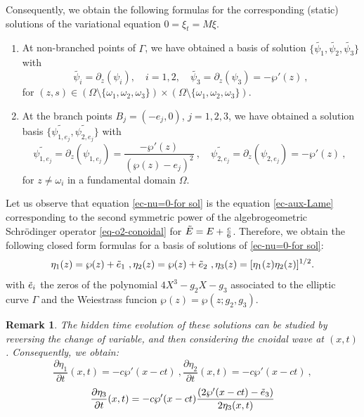 \documentclass[a4paper,12pt]{article}
\newtheorem{rem}[thm]{Remark}
\begin{document}
Consequently, we obtain the following formulas for the corresponding (static) solutions of the variational equation $0=\xi_t = M \xi$.

\begin{enumerate}
    \item At non-branched points of $\Gamma$, we have obtained a basis of solution $\{ \widetilde{\psi_1 }, \widetilde{\psi_2 }, \widetilde{\psi_3 } \} $  with
    \begin{equation*}
       \widetilde{\psi_i } = \partial_z (\psi_i )  , \quad i =1, 2 , \quad \widetilde{\psi_3 }= \partial_z ( \psi_3 ) = -\wp' (z)\ ,
    \end{equation*}
    for $(z,s ) \in \left( \Omega\setminus \{ \omega_1 , \omega_2 ,\omega_3 \} \right)\times \left( \Omega\setminus \{ \omega_1 , \omega_2 ,\omega_3 \} \right)$.
    \item At the branch points $B_j = (-e_j , 0)$, $j=1, 2, 3$, we have obtained a solution basis $\{ \widetilde{\psi_{1, e_j }} , \widetilde{\psi_{2, e_j }}  \} $  with
    \begin{equation*}
       \widetilde{\psi_{1, e_j }} =\partial_z ( \psi_{1, e_j })= \frac{-\wp' (z)}{(\wp (z)-e_j )^2 } \ , \quad  \widetilde{\psi_{2, e_j } } = \partial_z ( \psi_{2, e_j })= -\wp'(z)  \  , \  
    \end{equation*}
    for $z\not= \omega_i $ in a fundamental domain $\Omega$. 
\end{enumerate}



Let us observe that equation \eqref{ec-nu=0-for sol} is the equation \eqref{ec-aux-Lame} corresponding to the second symmetric power of the algebrogeometric Schr\"odinger operator \eqref{eq-o2-conoidal} for $\Tilde{E}= E+\frac{c}{6}$. Therefore, we obtain the following closed form formulas for a basis of solutions of \eqref{ec-nu=0-for sol}:
\begin{equation}
    \eta_1 (z)= \wp (z)+\Tilde{e}_1 \ , 
     \eta_2 (z)= \wp (z)+\Tilde{e}_2 \ , 
      \eta_3 (z)= [ \eta_1 (z)  \eta_2 (z) ]^{1/2} .
\end{equation}
with $\Tilde{e}_i $ the zeros of the polynomial $4 X^3-g_2 X -g_3$ associated to the elliptic curve $\Gamma$ and the Weiestrass funcion $\wp (z) = \wp  (z; g_2 , g_3 )$.


\begin{rem}
 The hidden time evolution of these solutions can be studied by reversing the change of variable, and then considering the cnoidal wave at $(x,t)$. Consequently, we obtain:
    \begin{equation}
    \frac{\partial \eta_1 }{\partial t} (x,t)= -c\wp' (x-ct) \ , 
     \frac{\partial \eta_2 }{\partial t} (x,t)= -c\wp' (x-ct)\ , 
\end{equation}
 \begin{equation}
         \frac{\partial \eta_3}{\partial t} (x,t)= 
        -c\wp' (x-ct)  \frac{   (2\wp' (x-ct)-\Tilde{e}_3 )  }{2 \eta_3 (x,t) } 
\end{equation}   
\end{rem}
\end{document}
